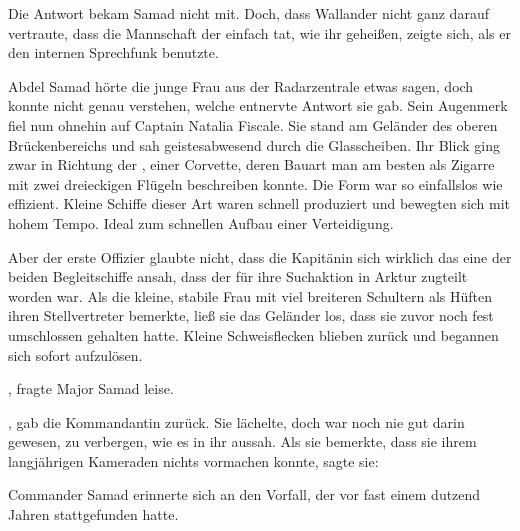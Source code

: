 \par

Die Antwort bekam Samad nicht mit.
Doch, dass Wallander nicht ganz darauf vertraute, dass die Mannschaft der  einfach tat, wie ihr geheißen, zeigte sich, als er den internen Sprechfunk benutzte.

\par

Abdel Samad hörte die junge Frau aus der Radarzentrale etwas sagen, doch konnte nicht genau verstehen, welche entnervte Antwort sie gab.
Sein Augenmerk fiel nun ohnehin auf Captain Natalia Fiscale.
Sie stand am Geländer des oberen Brückenbereichs und sah geistesabwesend durch die Glasscheiben.
Ihr Blick ging zwar in Richtung der , einer Corvette, deren Bauart man am besten als Zigarre mit zwei dreieckigen Flügeln beschreiben konnte.
Die Form war so einfallslos wie effizient.
Kleine Schiffe dieser Art waren schnell produziert und bewegten sich mit hohem Tempo.
Ideal zum schnellen Aufbau einer Verteidigung.

\par

Aber der erste Offizier glaubte nicht, dass die Kapitänin sich wirklich das eine der beiden Begleitschiffe ansah, dass der  für ihre Suchaktion in Arktur zugteilt worden war.
Als die kleine, stabile Frau mit viel breiteren Schultern als Hüften ihren Stellvertreter bemerkte, ließ sie das Geländer los, dass sie zuvor noch fest umschlossen gehalten hatte.
Kleine Schweisflecken blieben zurück und begannen sich sofort aufzulösen.

\par

, fragte Major Samad leise.

\par

, gab die Kommandantin zurück.
Sie lächelte, doch war noch nie gut darin gewesen, zu verbergen, wie es in ihr aussah.
Als sie bemerkte, dass sie ihrem langjährigen Kameraden nichts vormachen konnte, sagte sie: 

\par

Commander Samad erinnerte sich an den Vorfall, der vor fast einem dutzend Jahren stattgefunden hatte.

